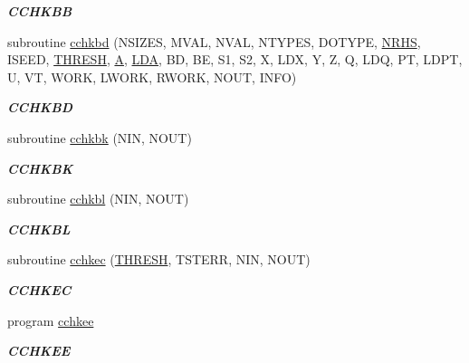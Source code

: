 \begin{DoxyCompactItemize}
\begin{DoxyCompactList}\small\item\em {\bfseries C\+C\+H\+K\+B\+B} \end{DoxyCompactList}\item 
subroutine \hyperlink{group__complex__eig_ga44246338e3797ea8686b9db821963411}{cchkbd} (N\+S\+I\+Z\+E\+S, M\+V\+A\+L, N\+V\+A\+L, N\+T\+Y\+P\+E\+S, D\+O\+T\+Y\+P\+E, \hyperlink{example__user_8c_aa0138da002ce2a90360df2f521eb3198}{N\+R\+H\+S}, I\+S\+E\+E\+D, \hyperlink{zlaqgs_8c_a0656018abfc9fa2821827415f5d5ea57}{T\+H\+R\+E\+S\+H}, \hyperlink{classA}{A}, \hyperlink{example__user_8c_ae946da542ce0db94dced19b2ecefd1aa}{L\+D\+A}, B\+D, B\+E, S1, S2, X, L\+D\+X, Y, Z, Q, L\+D\+Q, P\+T, L\+D\+P\+T, U, V\+T, W\+O\+R\+K, L\+W\+O\+R\+K, R\+W\+O\+R\+K, N\+O\+U\+T, I\+N\+F\+O)
\begin{DoxyCompactList}\small\item\em {\bfseries C\+C\+H\+K\+B\+D} \end{DoxyCompactList}\item 
subroutine \hyperlink{group__complex__eig_gae73239f7fc944d68873460e586be5953}{cchkbk} (N\+I\+N, N\+O\+U\+T)
\begin{DoxyCompactList}\small\item\em {\bfseries C\+C\+H\+K\+B\+K} \end{DoxyCompactList}\item 
subroutine \hyperlink{group__complex__eig_ga0c6abf11ff426c1ca494ccdce417484e}{cchkbl} (N\+I\+N, N\+O\+U\+T)
\begin{DoxyCompactList}\small\item\em {\bfseries C\+C\+H\+K\+B\+L} \end{DoxyCompactList}\item 
subroutine \hyperlink{group__complex__eig_ga33af268bb77b50a691195ec96919e2f4}{cchkec} (\hyperlink{zlaqgs_8c_a0656018abfc9fa2821827415f5d5ea57}{T\+H\+R\+E\+S\+H}, T\+S\+T\+E\+R\+R, N\+I\+N, N\+O\+U\+T)
\begin{DoxyCompactList}\small\item\em {\bfseries C\+C\+H\+K\+E\+C} \end{DoxyCompactList}\item 
program \hyperlink{group__complex__eig_ga53604133fb9ee893edcbd41d3863c2b4}{cchkee}
\begin{DoxyCompactList}\small\item\em {\bfseries C\+C\+H\+K\+E\+E} \end{DoxyCompactList}\item 

\end{DoxyCompactItemize}
